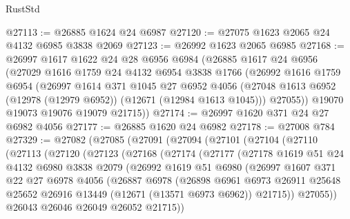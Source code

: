 \begin{lexlean}{RustStd}
\begin{coremodule}
@27113 := @26885 @1624 @24 @6987
@27120 := @27075 @1623 @2065 @24 @4132 @6985 @3838 @2069
@27123 := @26992 @1623 @2065 @6985
@27168 := @26997
    @1617
    @1622
    @24
    @28
    @6956
    @6984
    (@26885
      @1617
      @24
      @6956
      (@27029
        @1616
        @1759
        @24
        @4132
        @6954
        @3838
        @1766
        (@26992
          @1616
          @1759
          @6954
          (@26997
            @1614
            @371
            @1045
            @27
            @6952
            @4056
            (@27048 @1613 @6952 (@12978 (@12979 @6952)) (@12671 (@12984 @1613 @1045)))
            @27055))
        @19070
        @19073
        @19076
        @19079
        @21715))
@27174 := @26997 @1620 @371 @24 @27 @6982 @4056
@27177 := @26885 @1620 @24 @6982
@27178 := @27008 @784
@27329 := @27082
    (@27085
      (@27091
        (@27094
          (@27101
            (@27104
              (@27110
                (@27113
                  (@27120
                    (@27123
                      (@27168
                        (@27174
                          (@27177
                            (@27178
                              @1619
                              @51
                              @24
                              @4132
                              @6980
                              @3838
                              @2079
                              (@26992
                                @1619
                                @51
                                @6980
                                (@26997
                                  @1607
                                  @371
                                  @22
                                  @27
                                  @6978
                                  @4056
                                  (@26887
                                    @6978
                                    (@26898
                                      @6961
                                      @6973
                                      @26911
                                      @25648
                                      @25652
                                      @26916
                                      @13449
                                      (@12671 (@13571 @6973 @6962))
                                      @21715))
                                  @27055))
                              @26043
                              @26046
                              @26049
                              @26052
                              @21715))

\end{coremodule}
\end{lexlean}
